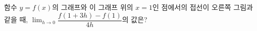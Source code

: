 \noindent\begin{minipage}[t]{0.58\linewidth}\vspace{0pt}\raggedright 함수 $y=f(x)$의 그래프와 이 그래프 위의 $x=1$인 점에서의 접선이 오른쪽 그림과 같을 때, $\displaystyle\lim_{h\to 0}\dfrac{f(1+3h)-f(1)}{4h}$의 값은?\end{minipage}\hfill\begin{minipage}[t]{0.4\linewidth}\vspace{0pt}\centering \resizebox{\ifdim\width>\linewidth\linewidth\else\width\fi}{!}{}\end{minipage}\par
{}
